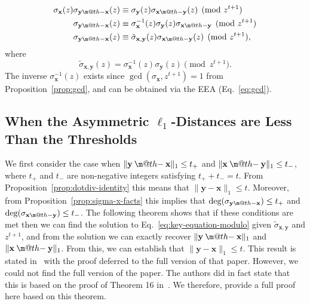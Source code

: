 \documentclass[pdflatex,sn-mathphys-num]{sn-jnl}
\makeatletter
\newcommand{\dotdiv}{\mathbin{\text{\@dotdiv}}}
\newcommand{\@dotdiv}{%
  \ooalign{\hidewidth\raise1ex\hbox{.}\hidewidth\cr$\m@th-$\cr}%
}
\theoremstyle{definition}
\newcommand{\vtr}[1]{\mathbf{#1}}
\newcommand{\norm}[1]{\lVert{#1}\rVert}
\makeatother
\begin{document}
\begin{align}
    \sigma_\vtr{x}(z) \sigma_{\vtr{y} \dotdiv \vtr{x}}(z) &\equiv \sigma_\vtr{y}(z) \sigma_{\vtr{x} \dotdiv \vtr{y}} (z)\pmod{z^{t+1}} \nonumber \\
    \sigma_{\vtr{y} \dotdiv \vtr{x}}(z) &\equiv 
    \sigma^{-1}_\vtr{x}(z) \sigma_\vtr{y}(z) \sigma_{\vtr{x} \dotdiv \vtr{y}} \pmod{z^{t+1}}\nonumber\\
    \sigma_{\vtr{y} \dotdiv \vtr{x}}(z) 
    &\equiv \tilde{\sigma}_{\vtr{x}, \vtr{y}}(z) \sigma_{\vtr{x} \dotdiv \vtr{y}}(z) \pmod{z^{t+1}}, \label{eq:key-equation-modulo}
\end{align}
where 
\[
\tilde{\sigma}_{\vtr{x}, \vtr{y}}(z) =  \sigma^{-1}_\vtr{x}(z) \sigma_\vtr{y}(z) \pmod{z^{t+1}}.
\]
The inverse $\sigma^{-1}_\vtr{x}(z)$ exists since $\gcd (\sigma_\vtr{x}, z^{t+1}) = 1$ from Proposition~\ref{prop:gcd}, and can be obtained via the EEA (Eq.~\eqref{eq:gcd}).

\subsection{\texorpdfstring{When the Asymmetric $\ell_1$-Distances are Less Than the Thresholds}{When the Asymmetric l1-Distance is Less Than the Thresholds}}
\label{subsec:l1-less-than-t}
We first consider the case when $\norm{\vtr{y} \dotdiv \vtr{x}}_1 \leq t_+ $ and $\norm{\vtr{x} \dotdiv \vtr{y}}_1 \leq t_-$, where $t_+$ and $t_-$ are non-negative integers satisfying $t_+ + t_- = t$. From Proposition~\ref{prop:dotdiv-identity} this means that $\norm{\vtr{y} - \vtr{x}}_1 \leq t$. Moreover, from Proposition~\ref{prop:sigma-x-facts} this implies that $\text{deg}(\sigma_{\vtr{y} \dotdiv \vtr{x}}) \leq t_+$
 and $\text{deg}(\sigma_{\vtr{x} \dotdiv \vtr{y}}) \leq t_-$. The following theorem shows that if these conditions are met then we can find the solution to Eq.~\eqref{eq:key-equation-modulo} given $\tilde{\sigma}_{\vtr{x}, \vtr{y}}$ and $z^{t+1}$, and from the solution we can exactly recover $\norm{\vtr{y} \dotdiv \vtr{x}}_1$ and $\norm{\vtr{x} \dotdiv \vtr{y}}_1$. From this, we can establish that $\norm{\vtr{y} - \vtr{x}}_1 \leq t$. This result is stated in~\cite{tallinil1codes} with the proof deferred to the full version of that paper. However, we could not find the full version of the paper. The authors did in fact state that this is based on the proof of Theorem 16 in~\cite[\S 12.8]{toecc-book}. We therefore, provide a full proof here based on this theorem.
\end{document}
